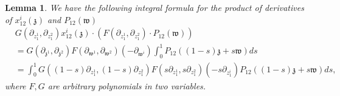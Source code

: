 \documentclass[11pt]{amsart}
\newtheorem{lem}[thm]{Lemma}
\theoremstyle{definition}
\theoremstyle{remark}
\numberwithin{equation}{section}
\begin{document}
\begin{lem}\label{IntegralXP}
We have the following integral formula for the product of derivatives of $x^i_{12}(\mathfrak{z})$ and $P_{12}(\mathfrak{w})$
\begin{align*}
    &G(\partial_{z^1_{1}},\partial_{z^2_{1}})x^i_{12}(\mathfrak{z})\cdot\left( F(\partial_{z^1_{1}},\partial_{z^2_{1}})\cdot P_{12}(\mathfrak{w})\right)\\
&=G(\partial_{\mathfrak{z}^1},\partial_{\mathfrak{z}^2})F(\partial_{\mathfrak{w}^1},\partial_{\mathfrak{w}^2})(-\partial_{\mathfrak{w}^i})\int^1_0P_{12}\left((1-s)\mathfrak{z}+s\mathfrak{w}\right)ds\\
&=\int^1_0G\left((1-s)\partial_{z^1_1},(1-s)\partial_{z^2_1}\right)F\left(s\partial_{z^1_1},s\partial_{z^2_1}\right)(-s\partial_{z^i_1})P_{12}\left((1-s)\mathfrak{z}+s\mathfrak{w}\right)ds,
\end{align*}
  where $F,G$ are arbitrary polynomials in two variables.
\end{lem}
\end{document}
